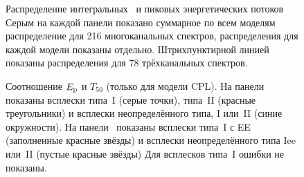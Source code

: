 \begin{figure}
	\begin{center}
	\end{center}
\caption{
    Распределение интегральных~ и пиковых энергетических потоков~
    Серым на каждой панели показано суммарное по всем моделям распределение для 216
    многоканальных спектров, распределения для каждой модели показаны отдельно. 
    Штрихпунктирной линией показаны распределения для 78 трёхканальных спектров.
    \label{fig:fl_pf_dist} }
\end{figure}

\begin{figure}
	\begin{center}
	\end{center}
\caption{
    Соотношение $E_{\mathrm{p}}$ и $T_{50}$ (только для модели CPL).
    На панели~ показаны всплески типа~I (серые точки), типа~II (красные треугольники)
    и всплески неопределённого типа, I или~II (синие окружности).
    На панели~ показаны всплески типа~I с EE (заполненные красные звёзды)
    и всплески неопределённого типа Iee или~II (пустые красные звёзды)
    Для всплесков типа~I ошибки не показаны. 
    \label{fig:EpT50}}
\end{figure}

